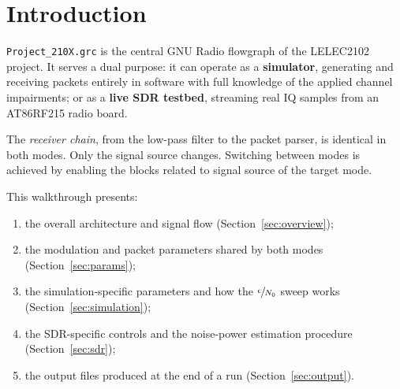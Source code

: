 \section*{Introduction}

\texttt{Project\_210X.grc} is the central GNU Radio flowgraph of the LELEC2102 project. It serves a dual purpose: it can operate as a \textbf{simulator},
generating and receiving packets entirely in software with full knowledge of the
applied channel impairments; or as a \textbf{live SDR testbed}, streaming real IQ
samples from an AT86RF215 radio board.

The \emph{receiver chain}, from the low-pass filter to the packet parser, is identical in both modes. Only the signal source changes.
Switching between modes is achieved by enabling the blocks related to signal source of the target mode.

This walkthrough presents:
\begin{enumerate}
  \item the overall architecture and signal flow (Section~\ref{sec:overview});
  \item the modulation and packet parameters shared by both modes (Section~\ref{sec:params});
  \item the simulation-specific parameters and how the $\sfrac{\epsilon}{N_0}$ sweep works (Section~\ref{sec:simulation});
  \item the SDR-specific controls and the noise-power estimation procedure (Section~\ref{sec:sdr});
  \item the output files produced at the end of a run (Section~\ref{sec:output}).
\end{enumerate}
